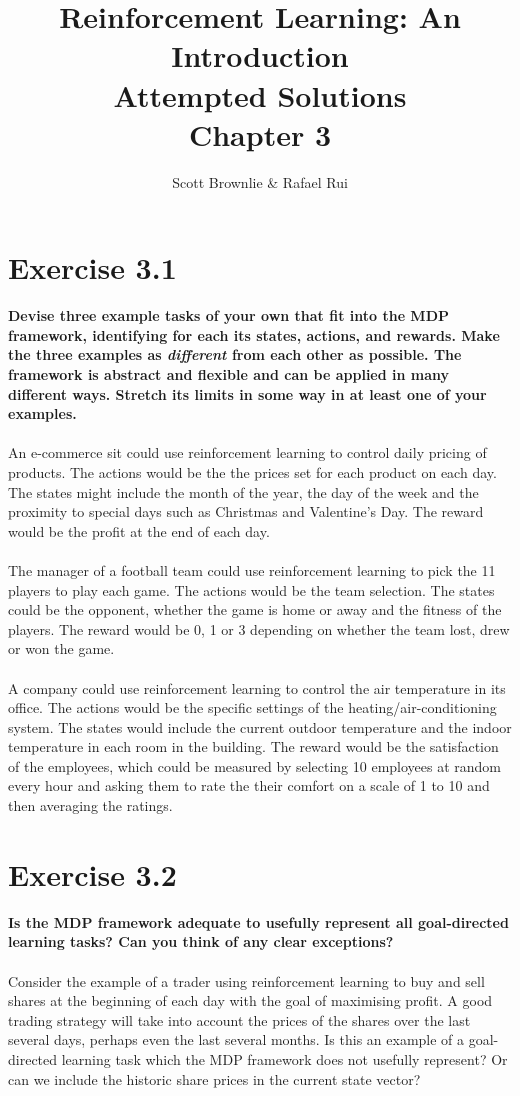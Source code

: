 \documentclass[a4paper,11pt]{article}
\title{Reinforcement Learning: An Introduction \\ Attempted Solutions \\ Chapter 3}
\author{Scott Brownlie \& Rafael Rui}
\date{}
\numberwithin{equation}{section}
\theoremstyle{remark}
\begin{document}
\maketitle

\section{Exercise 3.1}

\textbf{Devise three example tasks of your own that fit into the MDP framework, identifying for each its states, actions, and rewards. Make the three examples as \emph{different} from each other as possible. The framework is abstract and flexible and can be applied in many different ways. Stretch its limits in some way in at least one of your examples.}
\\ \\
An e-commerce sit could use reinforcement learning to control daily pricing of products. The actions would be the the prices set for each product on each day. The states might include the month of the year, the day of the week and the proximity to special days such as Christmas and Valentine's Day. The reward would be the profit at the end of each day.
\\ \\
The manager of a football team could use reinforcement learning to pick the 11 players to play each game. The actions would be the team selection. The states could be the opponent, whether the game is home or away and the fitness of the players. The reward would be 0, 1 or 3 depending on whether the team lost, drew or won the game.  
\\ \\
A company could use reinforcement learning to control the air temperature in its office. The actions would be the specific settings of the heating/air-conditioning system. The states would include the current outdoor temperature and the indoor temperature in each room in the building. The reward would be the satisfaction of the employees, which could be measured by selecting 10 employees at random every hour and asking them to rate the their comfort on a scale of 1 to 10 and then averaging the ratings.

\section{Exercise 3.2}

\textbf{Is the MDP framework adequate to usefully represent all goal-directed learning tasks? Can you think of any clear exceptions?}
\\ \\
Consider the example of a trader using reinforcement learning to buy and sell shares at the beginning of each day with the goal of maximising profit. A good trading strategy will take into account the prices of the shares over the last several days, perhaps even the last several months. Is this an example of a goal-directed learning task which the MDP framework does not usefully represent? Or can we include the historic share prices in the current state vector?
\end{document}
